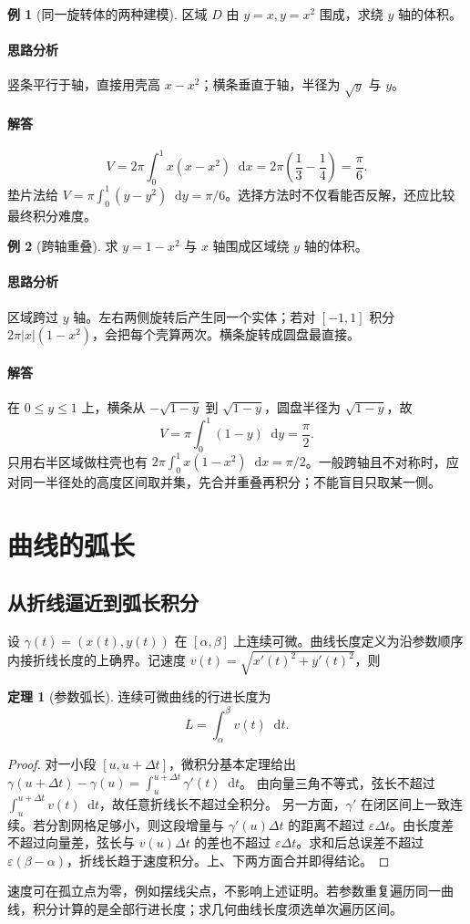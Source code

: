 \documentclass[UTF8,fontset=fandol,12pt,oneside,openany]{ctexrep}
\newcommand{\dd}{\mathop{}\!\mathrm d}
\theoremstyle{definition}
\newtheorem{theorem}{定理}[chapter]
\newtheorem{example}{例}[chapter]
\begin{document}
\begin{example}[同一旋转体的两种建模]
区域 $D$ 由 $y=x,y=x^2$ 围成，求绕 $y$ 轴的体积。
\end{example}
\paragraph{思路分析}竖条平行于轴，直接用壳高 $x-x^2$；横条垂直于轴，半径为 $\sqrt y$ 与 $y$。
\paragraph{解答}
\[
 V=2\pi\int_0^1x(x-x^2)\dd x=2\pi\left(\frac13-\frac14\right)=\frac\pi6.
\]
垫片法给 $V=\pi\int_0^1(y-y^2)\dd y=\pi/6$。选择方法时不仅看能否反解，还应比较最终积分难度。

\begin{example}[跨轴重叠]
求 $y=1-x^2$ 与 $x$ 轴围成区域绕 $y$ 轴的体积。
\end{example}
\paragraph{思路分析}区域跨过 $y$ 轴。左右两侧旋转后产生同一个实体；若对 $[-1,1]$ 积分 $2\pi|x|(1-x^2)$，会把每个壳算两次。横条旋转成圆盘最直接。
\paragraph{解答}在 $0\le y\le1$ 上，横条从 $-\sqrt{1-y}$ 到 $\sqrt{1-y}$，圆盘半径为 $\sqrt{1-y}$，故
\[
 V=\pi\int_0^1(1-y)\dd y=\frac\pi2.
\]
只用右半区域做柱壳也有 $2\pi\int_0^1x(1-x^2)\dd x=\pi/2$。一般跨轴且不对称时，应对同一半径处的高度区间取并集，先合并重叠再积分；不能盲目只取某一侧。

\section{曲线的弧长}
\label{lec:12:length}
\subsection{从折线逼近到弧长积分}
设 $\gamma(t)=(x(t),y(t))$ 在 $[\alpha,\beta]$ 上连续可微。曲线长度定义为沿参数顺序内接折线长度的上确界。记速度 $v(t)=\sqrt{x'(t)^2+y'(t)^2}$，则
\begin{theorem}[参数弧长]
连续可微曲线的行进长度为
\[
 L=\int_\alpha^\beta v(t)\dd t.
\]
\end{theorem}
\begin{proof}
对一小段 $[u,u+\Delta t]$，微积分基本定理给出
$\gamma(u+\Delta t)-\gamma(u)=\int_u^{u+\Delta t}\gamma'(t)\dd t$。
由向量三角不等式，弦长不超过 $\int_u^{u+\Delta t}v(t)\dd t$，故任意折线长不超过全积分。
另一方面，$\gamma'$ 在闭区间上一致连续。若分割网格足够小，则这段增量与 $\gamma'(u)\Delta t$ 的距离不超过 $\varepsilon\Delta t$。由长度差不超过向量差，弦长与 $v(u)\Delta t$ 的差也不超过 $\varepsilon\Delta t$。求和后总误差不超过 $\varepsilon(\beta-\alpha)$，折线长趋于速度积分。上、下两方面合并即得结论。
\end{proof}
速度可在孤立点为零，例如摆线尖点，不影响上述证明。若参数重复遍历同一曲线，积分计算的是全部行进长度；求几何曲线长度须选单次遍历区间。
\end{document}

